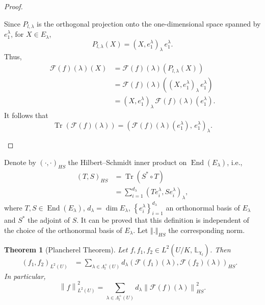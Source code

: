 \documentclass[11pt,a4paper]{amsart}
\DeclareMathOperator{\Tr}{Tr}
\DeclareMathOperator{\End}{End}
\newtheorem{theorem}{Theorem}[section]
\theoremstyle{definition}
\numberwithin{equation}{section}
\begin{document}
{\begin{proof}
\begin{itemize}
Since \( P_{l,\lambda} \) is the orthogonal projection onto the one-dimensional space spanned by \( e_1^\lambda \), for \( X \in E_\lambda \),
\[
P_{l,\lambda}(X) = (X, e_1^\lambda)_\lambda \, e_1^\lambda.
\]
Thus,
\begin{align*}
\mathcal{F}(f)(\lambda)(X)
&= \mathcal{F}(f)(\lambda)(P_{l,\lambda}(X)) \\
&= \mathcal{F}(f)(\lambda)\left( (X, e_1^\lambda)_\lambda \, e_1^\lambda \right) \\
&= (X, e_1^\lambda)_\lambda \, \mathcal{F}(f)(\lambda)(e_1^\lambda).
\end{align*}
It follows that
\[
\Tr\left( \mathcal{F}(f)(\lambda) \right) = \left( \mathcal{F}(f)(\lambda)(e_1^\lambda),\, e_1^\lambda \right)_\lambda.
\]  
  
  
  
   
\end{itemize}
\end{proof}}
 
 
Denote by $(\cdot, \cdot)_{HS}$ the Hilbert–Schmidt inner product
 on $\End\left( E_{\lambda}\right) $,  i.e., 
 \begin{align}
\left( T, S\right) _{HS} & = \Tr\left( S^* \circ T \right) \nonumber\\
 & = \sum_{i=1}^{d_\lambda}\left( T e^\lambda_i , S e^\lambda_i \right) _{\lambda}, \label{Hilbert-Schmidt inner product} \nonumber 
 \end{align}
where $T, S \in  \End\left(E_{\lambda}\right)$, $d_\lambda=\dim E_\lambda$, $ \left\lbrace e^\lambda_i \right\rbrace_{i=1}^{d_\lambda} $ 
an orthonormal  basis of $E_{\lambda}$ and  $S^*$ the adjoint of $S$. It can be proved that this definition is independent of the choice of the orthonormal basis of $E_\lambda$. Let  $ \left\Vert . \right\Vert_{HS}$ the corresponding norm.
 
{   \begin{theorem}[Plancherel Theorem]  Let $f , f_1, f_2\in L^2 \left(U/K, \, \mathbb{L}_{\chi_l}\right)$. Then 
 \begin{align*}
\left( f_1,f_2 \right)_{L^2(U)}&= \sum _{\lambda\in \Lambda_l^+\left(U \right)} d_\lambda \left( \mathcal{F}(f_1 ) (\lambda), \mathcal{F} (f_2)(\lambda) \right)_{HS}.  &  
\end{align*}
In particular,
$$
\left\|f \right\|_{L^2\left( U\right) }^2 =\sum _{\lambda\in \Lambda_l^+\left(U \right)} d_\lambda \left\|  \mathcal{F}(f) (\lambda)\right\|_{HS}^2.
$$
\end{theorem}
}
\end{document}
